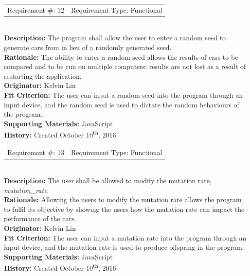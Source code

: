 \documentclass[12pt, titlepage]{article}
\begin{document}
\begin{reqbox}
%
\begin{tabular}{cc}
Requirement \#: 12 & Requirement Type: Functional \\
\end{tabular} \\
%
\textbf{Description:} The program shall allow the user to enter a random seed to 
generate cars from in lieu of a randomly generated seed. \\
\textbf{Rationale:} The ability to enter a random seed allows the results of 
cars to be compared and to be run on multiple computers: results are not lost as 
a result of restarting the application. \\
\textbf{Originator:} Kelvin Lin\\
\textbf{Fit Criterion:} The user can input a random seed into the program 
through an input device, and the random seed is used to dictate the random 
behaviours of the program.\\
%  
\textbf{Supporting Materials:} JavaScript \\
\textbf{History:} Created October 10\textsuperscript{th}, 2016
%
\end{reqbox}

\begin{reqbox}
%
\begin{tabular}{cc}
Requirement \#: 13 & Requirement Type: Functional \\
\end{tabular} \\
%
\textbf{Description:} The user shall be allowed to modify the mutation rate, 
\textit{mutation\_rate}. \\
\textbf{Rationale:} Allowing the users to modify the mutation rate allows the 
program to fulfil its objective by showing the users how the mutation rate can 
impact the performance of the cars. \\
\textbf{Originator:} Kelvin Lin\\
\textbf{Fit Criterion:} The user can input a mutation rate into the program 
through an input device, and the mutation rate is used to produce offspring in 
the program.\\
%  
\textbf{Supporting Materials:} JavaScript \\
\textbf{History:} Created October 10\textsuperscript{th}, 2016
%
\end{reqbox}

\newpage
\end{document}
